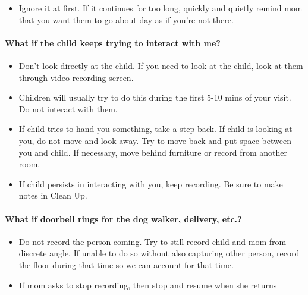 \documentclass[
]{book}
\providecommand{\tightlist}{%
  \setlength{\itemsep}{0pt}\setlength{\parskip}{0pt}}
\begin{document}
\begin{itemize}
\tightlist
\item
  Ignore it at first. If it continues for too long, quickly and quietly remind mom that you want them to go about day as if you're not there.
\end{itemize}

\hypertarget{what-if-the-child-keeps-trying-to-interact-with-me}{%
\paragraph*{What if the child keeps trying to interact with me?}\label{what-if-the-child-keeps-trying-to-interact-with-me}}

\begin{itemize}
\tightlist
\item
  Don't look directly at the child. If you need to look at the child, look at them through video recording screen.
\item
  Children will usually try to do this during the first 5-10 mins of your visit. Do not interact with them.
\item
  If child tries to hand you something, take a step back. If child is looking at you, do not move and look away. Try to move back and put space between you and child. If necessary, move behind furniture or record from another room.
\item
  If child persists in interacting with you, keep recording. Be sure to make notes in Clean Up.
\end{itemize}

\hypertarget{what-if-doorbell-rings-for-the-dog-walker-delivery-etc.}{%
\paragraph*{What if doorbell rings for the dog walker, delivery, etc.?}\label{what-if-doorbell-rings-for-the-dog-walker-delivery-etc.}}

\begin{itemize}
\tightlist
\item
  Do not record the person coming. Try to still record child and mom from discrete angle. If unable to do so without also capturing other person, record the floor during that time so we can account for that time.
\item
  If mom asks to stop recording, then stop and resume when she returns
\end{itemize}
\end{document}
